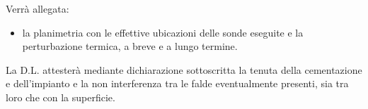 Verrà allegata:
\begin{itemize}
\item la planimetria con le effettive ubicazioni delle sonde eseguite e la perturbazione termica, a breve e a lungo termine.
\end{itemize}

La D.L. attesterà mediante dichiarazione sottoscritta la tenuta della cementazione e dell'impianto e la non interferenza tra le falde eventualmente presenti, sia tra loro che con la superficie.